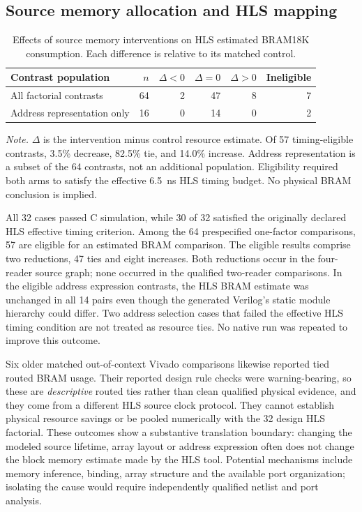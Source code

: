 \documentclass{article}
\newcommand{\tablenote}[1]{\par\vspace{3pt}\begin{minipage}{\linewidth}\footnotesize\emph{Note.} #1\end{minipage}}
\begin{document}
\subsection{Source memory allocation and HLS mapping}
\begin{table}[H]
\centering
\caption{Effects of source memory interventions on HLS estimated BRAM18K consumption. Each difference is relative to its matched control.}
\label{tab:hls-factorial}
\small
\renewcommand{\arraystretch}{1.16}
\setlength{\tabcolsep}{3.5pt}
\begin{tabularx}{\linewidth}{@{}Xrrrrr@{}}
\toprule
Contrast population & $n$ & $\Delta<0$ & $\Delta=0$ & $\Delta>0$ & Ineligible \\
\midrule
All factorial contrasts & 64 & 2 & 47 & 8 & 7 \\
Address representation only & 16 & 0 & 14 & 0 & 2 \\
\bottomrule
\end{tabularx}
\tablenote{$\Delta$ is the intervention minus control resource estimate. Of 57 timing-eligible contrasts, 3.5\% decrease, 82.5\% tie, and 14.0\% increase. Address representation is a subset of the 64 contrasts, not an additional population. Eligibility required both arms to satisfy the effective 6.5~ns HLS timing budget. No physical BRAM conclusion is implied.}
\end{table}

All 32 cases passed C simulation, while 30 of 32 satisfied the originally declared HLS effective timing criterion. Among the 64 prespecified one-factor comparisons, 57 are eligible for an estimated BRAM comparison. The eligible results comprise two reductions, 47 ties and eight increases. Both reductions occur in the four-reader source graph; none occurred in the qualified two-reader comparisons. In the eligible address expression contrasts, the HLS BRAM estimate was unchanged in all 14 pairs even though the generated Verilog's static module hierarchy could differ. Two address selection cases that failed the effective HLS timing condition are not treated as resource ties. No native run was repeated to improve this outcome.

Six older matched out-of-context Vivado comparisons likewise reported tied routed BRAM usage. Their reported design rule checks were warning-bearing, so these are \emph{descriptive} routed ties rather than clean qualified physical evidence, and they come from a different HLS source clock protocol. They cannot establish physical resource savings or be pooled numerically with the 32 design HLS factorial. These outcomes show a substantive translation boundary: changing the modeled source lifetime, array layout or address expression often does not change the block memory estimate made by the HLS tool. Potential mechanisms include memory inference, binding, array structure and the available port organization; isolating the cause would require independently qualified netlist and port analysis.
\end{document}
